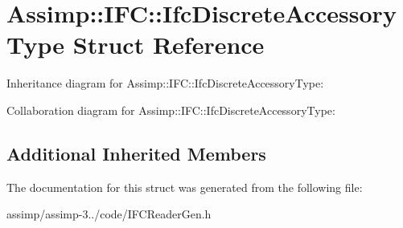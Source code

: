 \hypertarget{struct_assimp_1_1_i_f_c_1_1_ifc_discrete_accessory_type}{\section{Assimp\+:\+:I\+F\+C\+:\+:Ifc\+Discrete\+Accessory\+Type Struct Reference}
\label{struct_assimp_1_1_i_f_c_1_1_ifc_discrete_accessory_type}
}


Inheritance diagram for Assimp\+:\+:I\+F\+C\+:\+:Ifc\+Discrete\+Accessory\+Type\+:


Collaboration diagram for Assimp\+:\+:I\+F\+C\+:\+:Ifc\+Discrete\+Accessory\+Type\+:
\subsection*{Additional Inherited Members}


The documentation for this struct was generated from the following file\+:\begin{DoxyCompactItemize}
\item 
assimp/assimp-\/3../code/I\+F\+C\+Reader\+Gen.\+h\end{DoxyCompactItemize}
